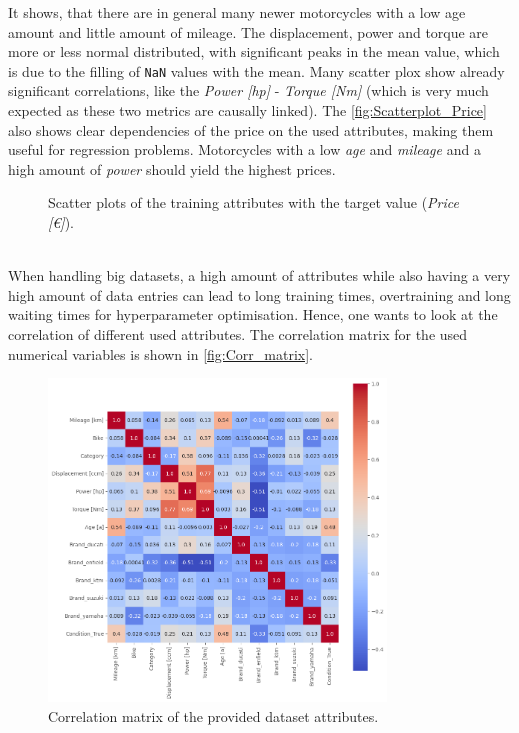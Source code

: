 It shows, that there are in general many newer motorcycles with a low age amount and little amount of mileage. The displacement,
power and torque are more or less normal distributed, with significant peaks in the mean value, which is due to the filling of \texttt{NaN}
values with the mean. Many scatter plox show already significant correlations, like the \textit{Power [hp]} - \textit{Torque [Nm]} (which
is very much expected as these two metrics are causally linked). The \autoref{fig:Scatterplot_Price} also shows clear dependencies
of the price on the used attributes, making them useful for regression problems. Motorcycles with a low \textit{age} and \textit{mileage} and a high amount
of \textit{power} should yield the highest prices.
\begin{figure}
    \centering
        \caption{Scatter plots of the training attributes with the target value (\textit{Price [€]}).}
        \label{fig:Scatterplot_Price}
\end{figure}
\\When handling big datasets, a high amount of attributes while also having a very high amount of data entries can lead
to long training times, overtraining and long waiting times for hyperparameter optimisation. Hence, one wants to look at the correlation
of different used attributes. The correlation matrix for the used numerical variables is shown in \autoref{fig:Corr_matrix}.
\begin{figure}[!]
    \centering
        \includegraphics[width=0.8\textwidth]{"content/pics/correlation_matrix.png"}
        \caption{Correlation matrix of the provided dataset attributes.}
        \label{fig:Corr_matrix}
\end{figure}
